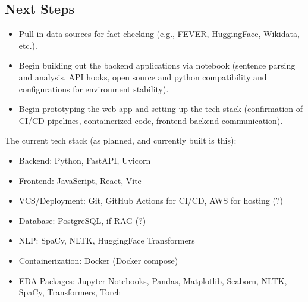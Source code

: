 \documentclass[11pt,letterpaper]{article}
\newcommand{\nextSteps}[1]{
    \subsection*{Next Steps}
    #1
}
\begin{document}
\nextSteps{
    \begin{itemize}
        \item Pull in data sources for fact-checking (e.g., FEVER, HuggingFace, Wikidata, etc.).
        \item Begin building out the backend applications via notebook (sentence parsing and analysis, API hooks, open source and python compatibility and configurations for environment stability).
        \item Begin prototyping the web app and setting up the tech stack (confirmation of CI/CD pipelines, containerized code, frontend-backend communication).
    \end{itemize}

    The current tech stack (as planned, and currently built is this):
    \begin{itemize}
        \item Backend: Python, FastAPI, Uvicorn
        \item Frontend: JavaScript, React, Vite
        \item VCS/Deployment: Git, GitHub Actions for CI/CD, AWS for hosting (?)
        \item Database: PostgreSQL, if RAG (?)
        \item NLP: SpaCy, NLTK, HuggingFace Transformers
        \item Containerization: Docker (Docker compose)
        \item EDA Packages: Jupyter Notebooks, Pandas, Matplotlib, Seaborn, NLTK, SpaCy, Transformers, Torch
    \end{itemize}
}
\end{document}
